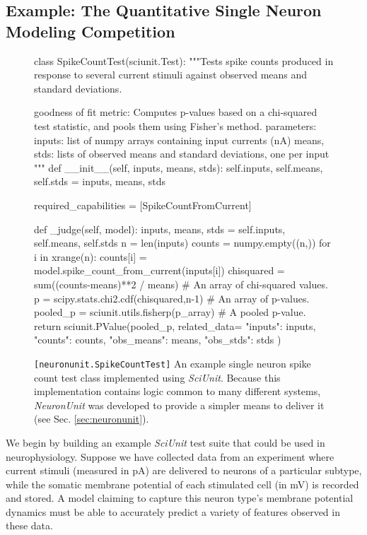 \documentclass{frontiersSCNS}
\begin{document}
\subsection{Example: The Quantitative Single Neuron Modeling Competition}\label{sec:example}
\begin{figure}
\small
\begin{python}
class SpikeCountTest(sciunit.Test):
  """Tests spike counts produced in response to several current stimuli against observed means and standard deviations. 

  goodness of fit metric: Computes p-values based on a chi-squared test statistic, and pools them using Fisher's method.
  parameters:
    inputs: list of numpy arrays containing input currents (nA)
    means, stds: lists of observed means and standard deviations, one per input
  """
  def __init__(self, inputs, means, stds):
    self.inputs, self.means, self.stds = inputs, means, stds
	
  required_capabilities = [SpikeCountFromCurrent]
	
  def _judge(self, model):
    inputs, means, stds = self.inputs, self.means, self.stds
    n = len(inputs)
    counts = numpy.empty((n,))
    for i in xrange(n):
      counts[i] = model.spike_count_from_current(inputs[i])
    chisquared = sum((counts-means)**2 / means) # An array of chi-squared values.  
    p = scipy.stats.chi2.cdf(chisquared,n-1) # An array of p-values.  
    pooled_p = sciunit.utils.fisherp(p_array) # A pooled p-value.  
    return sciunit.PValue(pooled_p, related_data={
      "inputs": inputs, "counts": counts, "obs_means": means, "obs_stds": stds
    })
\end{python}
\vspace{-15px}
\caption{\texttt{[neuronunit.SpikeCountTest]} An example single neuron spike count test class implemented using \textit{SciUnit}. Because this implementation contains logic common to many different systems, \textit{NeuronUnit} was developed to provide a simpler means to deliver it (see Sec. \ref{sec:neuronunit}).}
\label{fig:rate_test}
\vspace{-10px}
\end{figure}

We begin by building an example \textit{SciUnit} test suite that could be used in neurophysiology. 
Suppose we have collected data from an experiment where current stimuli (measured in pA) are delivered to neurons of a particular subtype, while the somatic membrane potential of each stimulated cell (in mV) is recorded and stored.  
A model claiming to capture this neuron type's membrane potential dynamics must be able to accurately predict a variety of features observed in these data.
\end{document}
